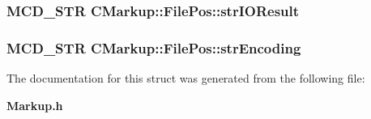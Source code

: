 \subsubsection[strIOResult]{\setlength{\rightskip}{0pt plus 5cm}MCD\_\-STR {\bf CMarkup::FilePos::strIOResult}}\label{structCMarkup_1_1FilePos_62db77f82233f3244272eb973a9ecfc8}


\subsubsection[strEncoding]{\setlength{\rightskip}{0pt plus 5cm}MCD\_\-STR {\bf CMarkup::FilePos::strEncoding}}\label{structCMarkup_1_1FilePos_b507cbd49031186d4b3fbf7d2d009c75}




The documentation for this struct was generated from the following file:\begin{CompactItemize}
\item 
{\bf Markup.h}\end{CompactItemize}
